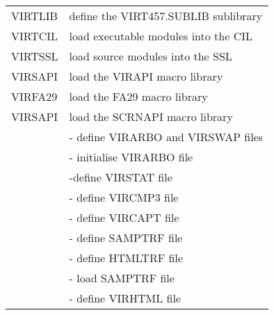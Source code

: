 \documentclass[letterpaper,10pt,english]{sphinxmanual}
\begin{document}
\begin{sphinxVerbatim}[commandchars=\\\{\}]
   
\end{sphinxVerbatim}


\begin{savenotes}\sphinxattablestart
\centering
\begin{tabulary}{\linewidth}[t]{|T|T|}
\hline
{}\relax &\relax \\
\hline
VIRTLIB
&
define the VIRT457.SUBLIB sublibrary
\\
\hline
VIRTCIL
&
load executable modules into the CIL
\\
\hline
VIRTSSL
&
load source modules into the SSL
\\
\hline
VIRSAPI
&
load the VIRAPI macro library
\\
\hline
VIRFA29
&
load the FA29 macro library
\\
\hline
VIRSAPI
&
load the SCRNAPI macro library
\\
\hline{}%
&
 - define VIRARBO and VIRSWAP files
\\
&
 - initialise VIRARBO file
\\
&
 -define VIRSTAT file
\\
&
 - define VIRCMP3 file
\\
&
 - define VIRCAPT file
\\
&
 - define SAMPTRF file
\\
&
 - define HTMLTRF file
\\
&
 - load SAMPTRF file
\\
&
 - define VIRHTML file
\\

\end{tabulary}
\end{savenotes}
\end{document}
